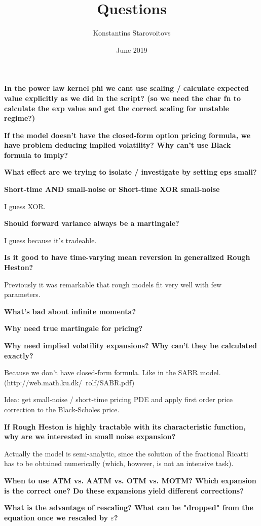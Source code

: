 \documentclass[12pt]{article}
\title{Questions}
\author{Konstantins Starovoitovs}
\date{June 2019}
\begin{document}
\maketitle

\textbf{In the power law kernel phi we cant use scaling / calculate expected value explicitly as we did in the script? (so we need the char fn to calculate the exp value and get the correct scaling for unstable regime?)}

\textbf{If the model doesn’t have the closed-form option pricing formula, we have problem deducing implied volatility? Why can’t use Black formula to imply?}

\textbf{What effect are we trying to isolate / investigate by setting eps small?}

\textbf{Short-time AND small-noise or Short-time XOR small-noise}

I guess XOR.

\textbf{Should forward variance always be a martingale?}

I guess because it's tradeable.

\textbf{Is it good to have time-varying mean reversion in generalized Rough Heston?}

Previously it was remarkable that rough models fit very well with few parameters.

\textbf{What's bad about infinite momenta?}

\textbf{Why need true martingale for pricing?}

\textbf{Why need implied volatility expansions? Why can’t they be calculated exactly?}

Because we don’t have closed-form formula. Like in the SABR model. (http://web.math.ku.dk/~rolf/SABR.pdf)

Idea: get small-noise / short-time pricing PDE and apply first order price correction to the Black-Scholes price.

\textbf{If Rough Heston is highly tractable with its characteristic function, why are we interested in small noise expansion?}

Actually the model is semi-analytic, since the solution of the fractional Ricatti has to be obtained numerically (which, however, is not an intensive task).

\textbf{When to use ATM vs. AATM vs. OTM vs. MOTM? Which expansion is the correct one? Do these expansions yield different corrections?}

\textbf{What is the advantage of rescaling? What can be "dropped" from the equation once we rescaled by $\varepsilon$?}
\end{document}
